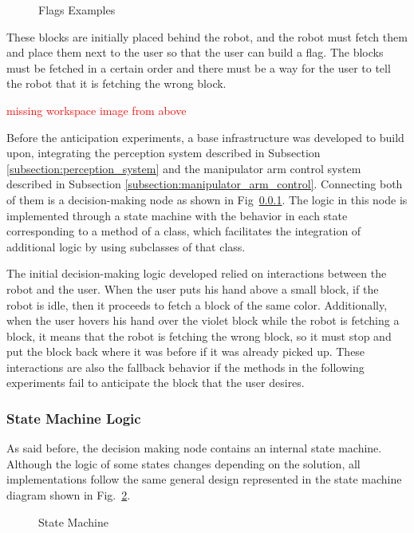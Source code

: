 \begin{figure}[H]%
    \centering
    
    \caption{Flags Examples}
    \label{fig:flags_examples}
\end{figure}

These blocks are initially placed behind the robot, and the robot must fetch them and place them next to the user so that the user can build a flag. The blocks must be fetched in a certain order and there must be a way for the user to tell the robot that it is fetching the wrong block.

\textcolor{red}{missing workspace image from above}

Before the anticipation experiments, a base infrastructure was developed to build upon, integrating the perception system described in Subsection \ref{subsection:perception_system} and the manipulator arm control system described in Subsection \ref{subsection:manipulator_arm_control}. Connecting both of them is a decision-making node as shown in Fig~\ref{}. The logic in this node is implemented through a state machine with the behavior in each state corresponding to a method of a class, which facilitates the integration of additional logic by using subclasses of that class.

The initial decision-making logic developed relied on interactions between the robot and the user. When the user puts his hand above a small block, if the robot is idle, then it proceeds to fetch a block of the same color. Additionally, when the user hovers his hand over the violet block while the robot is fetching a block, it means that the robot is fetching the wrong block, so it must stop and put the block back where it was before if it was already picked up. These interactions are also the fallback behavior if the methods in the following experiments fail to anticipate the block that the user desires.

\subsubsection{State Machine Logic}

As said before, the decision making node contains an internal state machine. Although the logic of some states changes depending on the solution, all implementations follow the same general design represented in the state machine diagram shown in Fig.~\ref{fig:state_machine}.

\begin{figure}[H]%
    \centering
    
    \caption{State Machine}
    \label{fig:state_machine}
\end{figure}

